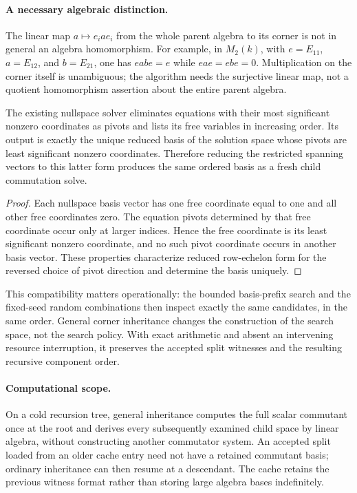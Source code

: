 \paragraph{A necessary algebraic distinction.}
The linear map $a\mapsto e_i a e_i$ from the whole parent algebra to its
corner is not in general an algebra homomorphism. For example, in
$M_2(k)$, with $e=E_{11}$, $a=E_{12}$, and $b=E_{21}$, one has
$eabe=e$ while $eae=ebe=0$. Multiplication on the corner itself is
unambiguous; the algorithm needs the surjective linear map, not a quotient
homomorphism assertion about the entire parent algebra.

\begin{lemma}
\label{lem:canonical-span}
The existing nullspace solver eliminates equations with their most
significant nonzero coordinates as pivots and lists its free variables in
increasing order. Its output is exactly the unique reduced basis of the
solution space whose pivots are least significant nonzero coordinates.
Therefore reducing the restricted spanning vectors to this latter form
produces the same ordered basis as a fresh child commutation solve.
\end{lemma}

\begin{proof}
Each nullspace basis vector has one free coordinate equal to one and all
other free coordinates zero. The equation pivots determined by that free
coordinate occur only at larger indices. Hence the free coordinate is its
least significant nonzero coordinate, and no such pivot coordinate occurs
in another basis vector. These properties characterize reduced row-echelon
form for the reversed choice of pivot direction and determine the basis
uniquely.\end{proof}

This compatibility matters operationally: the bounded basis-prefix search
and the fixed-seed random combinations then inspect exactly the same
candidates, in the same order. General corner inheritance changes the
construction of the search space, not the search policy. With exact
arithmetic and absent an intervening resource interruption, it preserves
the accepted split witnesses and the resulting recursive component order.

\paragraph{Computational scope.}
On a cold recursion tree, general inheritance computes the full scalar
commutant once at the root and derives every subsequently examined child
space by linear algebra, without constructing another commutator system.
An accepted split loaded from an older cache entry need not have a retained
commutant basis; ordinary inheritance can then resume at a descendant.
The cache retains the previous witness format rather than storing large
algebra bases indefinitely.

